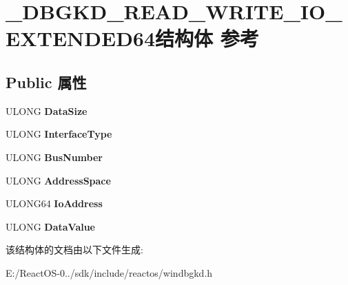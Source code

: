 \hypertarget{struct___d_b_g_k_d___r_e_a_d___w_r_i_t_e___i_o___e_x_t_e_n_d_e_d64}{}\section{\+\_\+\+D\+B\+G\+K\+D\+\_\+\+R\+E\+A\+D\+\_\+\+W\+R\+I\+T\+E\+\_\+\+I\+O\+\_\+\+E\+X\+T\+E\+N\+D\+E\+D64结构体 参考}
\label{struct___d_b_g_k_d___r_e_a_d___w_r_i_t_e___i_o___e_x_t_e_n_d_e_d64}
\subsection*{Public 属性}
\begin{DoxyCompactItemize}
\item 
\mbox{\label{struct___d_b_g_k_d___r_e_a_d___w_r_i_t_e___i_o___e_x_t_e_n_d_e_d64_aa3903474cb571b40f1b8d95755f8ac46}} 
U\+L\+O\+NG {\bfseries Data\+Size}
\item 
\mbox{\label{struct___d_b_g_k_d___r_e_a_d___w_r_i_t_e___i_o___e_x_t_e_n_d_e_d64_a98fc0a798a6f5f6ad3aa45925ebd139d}} 
U\+L\+O\+NG {\bfseries Interface\+Type}
\item 
\mbox{\label{struct___d_b_g_k_d___r_e_a_d___w_r_i_t_e___i_o___e_x_t_e_n_d_e_d64_ac8b0f334b3192911ce5649dbbfc3ddf7}} 
U\+L\+O\+NG {\bfseries Bus\+Number}
\item 
\mbox{\label{struct___d_b_g_k_d___r_e_a_d___w_r_i_t_e___i_o___e_x_t_e_n_d_e_d64_a54e7cb60ce49d6366365eff495466d6d}} 
U\+L\+O\+NG {\bfseries Address\+Space}
\item 
\mbox{\label{struct___d_b_g_k_d___r_e_a_d___w_r_i_t_e___i_o___e_x_t_e_n_d_e_d64_a62c751aaab0a1dc0c83d79d5a437fec7}} 
U\+L\+O\+N\+G64 {\bfseries Io\+Address}
\item 
\mbox{\label{struct___d_b_g_k_d___r_e_a_d___w_r_i_t_e___i_o___e_x_t_e_n_d_e_d64_ab1652fd6e1caa7f4e143db39ce09b899}} 
U\+L\+O\+NG {\bfseries Data\+Value}
\end{DoxyCompactItemize}


该结构体的文档由以下文件生成\+:\begin{DoxyCompactItemize}
\item 
E\+:/\+React\+O\+S-\/0../sdk/include/reactos/windbgkd.\+h\end{DoxyCompactItemize}
